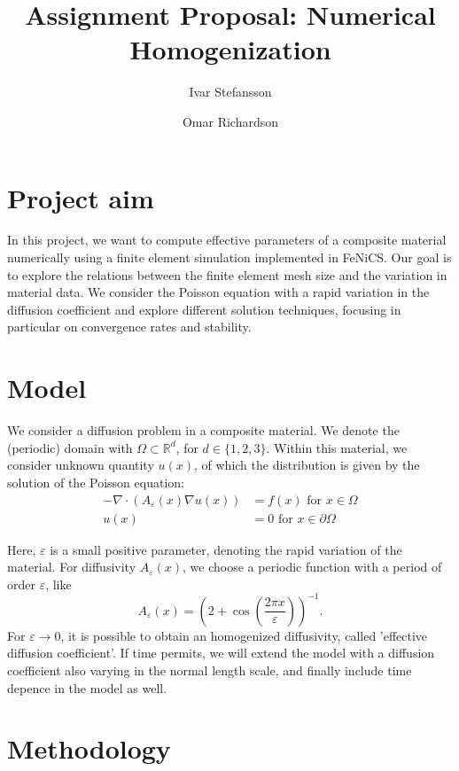 \documentclass{article}
\title{Assignment Proposal: Numerical Homogenization}\author[1]{Ivar Stefansson}
\author[2]{Omar Richardson}
\affil[1]{Department of Mathematics and Computer Science, Karlstad University}
\affil[2]{Department of Mathematics, University of Bergen}
\renewcommand{\epsilon}{\varepsilon}
\newcommand{\R}{\mathbb{ R}}
\begin{document}
\maketitle

\section{Project aim}
\label{sec:project_aim}

In this project, we want to compute effective parameters of a composite material numerically using a finite element simulation implemented in FeNiCS.
Our goal is to explore the relations between the finite element mesh size and the variation in material data.
We consider the Poisson equation with a rapid variation in the diffusion coefficient and explore different solution techniques, focusing in particular on convergence rates and stability.

\section{Model}
\label{sec:model}
We consider a diffusion problem in a composite material. We denote the (periodic) domain with $\Omega \subset \R^d$, for $d\in\{1,2,3\}$. Within this material, we consider unknown quantity $u(x)$, of which the distribution is given by the solution of the Poisson equation:
\begin{equation}
    \begin{split}
        -\nabla \cdot (A_\epsilon(x)\nabla u(x)) &= f(x) \mbox{ for } x \in \Omega\\
        u(x) &= 0 \mbox{ for } x \in \partial\Omega
    \end{split}
    \label{eq:model}
\end{equation}

Here, $\epsilon$ is a small positive parameter, denoting the rapid variation of the material.
For diffusivity $A_\epsilon(x)$, we choose a periodic function with a period of order $\epsilon$, like
$$ A_\epsilon(x) = \left( 2+\cos(\frac{2\pi x}{\epsilon}) \right)^{-1}.$$
For $\epsilon \to 0$, it is possible to obtain an homogenized diffusivity, called 'effective diffusion coefficient'.
If time permits, we will extend the model with a diffusion coefficient also varying in the normal length scale, and finally include time depence in the model as well.

\section{Methodology}
\label{sec:methodology}
\end{document}
